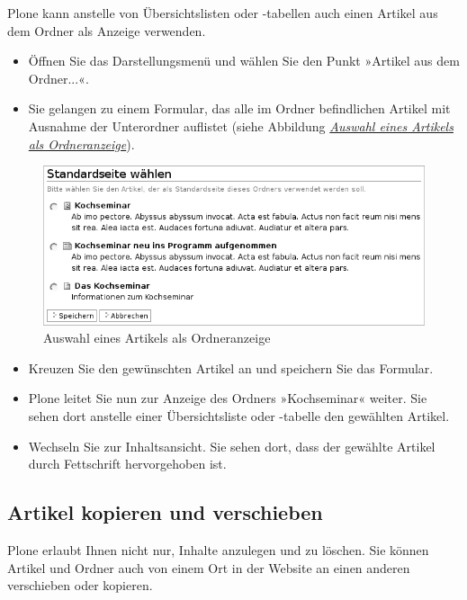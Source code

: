 \documentclass[a4paper,12pt,ngerman]{manual}
\begin{document}
Plone kann anstelle von Übersichtslisten oder -tabellen auch einen Artikel aus
dem Ordner als Anzeige verwenden.
\begin{itemize}
\item {} 
Öffnen Sie das Darstellungsmenü und wählen Sie den Punkt »Artikel
aus dem Ordner...«.

\item {} 
Sie gelangen zu einem Formular, das alle im Ordner befindlichen Artikel
mit Ausnahme der Unterordner auflistet (siehe
Abbildung \hyperlink{fig-standardseite}{\emph{Auswahl eines Artikels als Ordneranzeige}}).

\end{itemize}
\hypertarget{fig-standardseite}{}\begin{figure}[htbp]
\centering

\includegraphics{standardseite.png}
\caption{Auswahl eines Artikels als Ordneranzeige}\end{figure}
\begin{itemize}
\item {} 
Kreuzen Sie den gewünschten Artikel an und speichern Sie das Formular.

\item {} 
Plone leitet Sie nun zur Anzeige des Ordners »Kochseminar« weiter. Sie
sehen dort anstelle einer Übersichtsliste oder -tabelle den gewählten
Artikel.

\item {} 
Wechseln Sie zur Inhaltsansicht. Sie sehen dort, dass der gewählte
Artikel durch Fettschrift hervorgehoben ist.

\end{itemize}


\subsection{Artikel kopieren und verschieben}

Plone erlaubt Ihnen nicht nur, Inhalte anzulegen und
zu löschen. Sie können Artikel und Ordner auch von einem Ort in der Website
an einen anderen verschieben oder kopieren.
\end{document}
